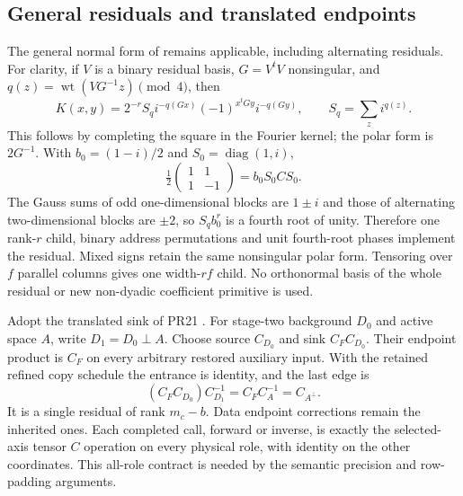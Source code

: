 \subsection{General residuals and translated endpoints}
The general normal form of 
remains applicable, including alternating residuals. For clarity, if
$V$ is a binary residual basis, $G=V^tV$ nonsingular, and
$q(z)=\operatorname{wt}(VG^{-1}z)\pmod4$, then
\[
 K(x,y)=2^{-r}S_q i^{-q(Gx)}(-1)^{x^tGy}i^{-q(Gy)},\qquad
 S_q=\sum_z i^{q(z)}.
\]
This follows by completing the square in the Fourier kernel; the polar
form is $2G^{-1}$. With $b_0=(1-i)/2$ and $S_0=\operatorname{diag}(1,i)$,
\[
 \tfrac12\begin{pmatrix}1&1\\1&-1\end{pmatrix}=b_0 S_0CS_0.
\]
The Gauss sums of odd one-dimensional blocks are $1\pm i$ and those
of alternating two-dimensional blocks are $\pm2$, so $S_qb_0^r$ is
a fourth root of unity. Therefore one rank-$r$ child, binary address
permutations and unit fourth-root phases implement the residual.
Mixed signs retain the same nonsingular polar form. Tensoring over
$f$ parallel columns gives one width-$rf$ child. No orthonormal basis
of the whole residual or new non-dyadic coefficient primitive is used.

Adopt the translated sink of PR21 \cite{pr21}. For stage-two background
$D_0$ and active space $A$, write $D_1=D_0\mathbin{\perp}A$.
Choose source $C_{D_0}$ and sink $C_FC_{D_0}$. Their endpoint product
is $C_F$ on every arbitrary restored auxiliary input. With the retained
refined copy schedule the entrance is identity, and the last edge is
\[
 (C_FC_{D_0})C_{D_1}^{-1}=C_FC_A^{-1}=C_{A^\perp}.
\]
It is a single residual of rank $m_c-b$. Data endpoint corrections
remain the inherited ones. Each completed call, forward or inverse,
is exactly the selected-axis tensor $C$ operation on every physical
role, with identity on the other coordinates. This all-role contract
is needed by the semantic precision and row-padding arguments.

